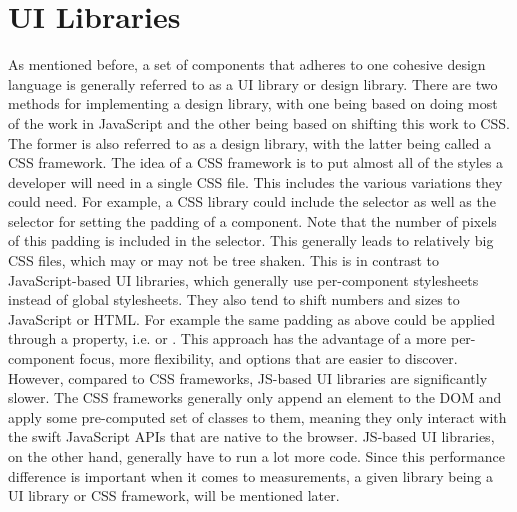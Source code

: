 \section{UI Libraries}\label{sec:bg:ui-libraries}
As mentioned before, a set of components that adheres to one cohesive design language is generally referred to as a UI library or design library. There are two methods for implementing a design library, with one being based on doing most of the work in JavaScript and the other being based on shifting this work to CSS. The former is also referred to as a design library, with the latter being called a CSS framework. The idea of a CSS framework is to put almost all of the styles a developer will need in a single CSS file. This includes the various variations they could need. For example, a CSS library could include the  selector as well as the  selector for setting the padding of a component. Note that the number of pixels of this padding is included in the selector. This generally leads to relatively big CSS files, which may or may not be tree shaken. This is in contrast to JavaScript-based UI libraries, which generally use per-component stylesheets instead of global stylesheets. They also tend to shift numbers and sizes to JavaScript or HTML\@. For example the same padding as above could be applied through a property, i.e.  or . This approach has the advantage of a more per-component focus, more flexibility, and options that are easier to discover. However, compared to CSS frameworks, JS-based UI libraries are significantly slower. The CSS frameworks generally only append an element to the DOM and apply some pre-computed set of classes to them, meaning they only interact with the swift JavaScript APIs that are native to the browser. JS-based UI libraries, on the other hand, generally have to run a lot more code. Since this performance difference is important when it comes to measurements, a given library being a UI library or CSS framework, will be mentioned later.
